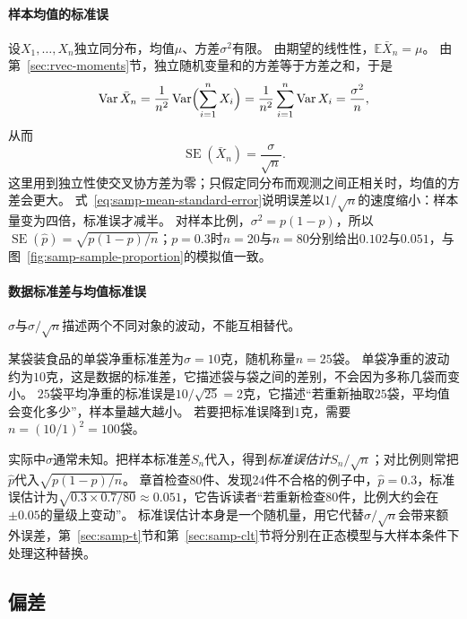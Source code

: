 \paragraph{样本均值的标准误}
设$X_1,\dots,X_n$独立同分布，均值$\mu$、方差$\sigma^2$有限。
由期望的线性性，$\mathbb{E}\bar X_n=\mu$。
由第~\ref{sec:rvec-moments}节，独立随机变量和的方差等于方差之和，于是
\[
  \operatorname{Var}\bar X_n=\frac1{n^2}\operatorname{Var}\Bigl(\sum_{i=1}^nX_i\Bigr)=\frac1{n^2}\sum_{i=1}^n\operatorname{Var}X_i=\frac{\sigma^2}{n},
\]
从而
\begin{equation}
  \operatorname{SE}(\bar X_n)=\frac{\sigma}{\sqrt n}.
  \label{eq:samp-mean-standard-error}
\end{equation}
这里用到独立性使交叉协方差为零；只假定同分布而观测之间正相关时，均值的方差会更大。
式~\eqref{eq:samp-mean-standard-error}说明误差以$1/\sqrt n$的速度缩小：样本量变为四倍，标准误才减半。
对样本比例，$\sigma^2=p(1-p)$，所以$\operatorname{SE}(\hat p)=\sqrt{p(1-p)/n}$；$p=0.3$时$n=20$与$n=80$分别给出$0.102$与$0.051$，与图~\ref{fig:samp-sample-proportion}的模拟值一致。

\paragraph{数据标准差与均值标准误}
$\sigma$与$\sigma/\sqrt n$描述两个不同对象的波动，不能互相替代。

\begin{example}[称重数据的两种标准差]
\label{ex:samp-weighing-standard-error}
某袋装食品的单袋净重标准差为$\sigma=10$克，随机称量$n=25$袋。
单袋净重的波动约为$10$克，这是数据的标准差，它描述袋与袋之间的差别，不会因为多称几袋而变小。
$25$袋平均净重的标准误是$10/\sqrt{25}=2$克，它描述“若重新抽取$25$袋，平均值会变化多少”，样本量越大越小。
若要把标准误降到$1$克，需要$n=(10/1)^2=100$袋。
\end{example}

实际中$\sigma$通常未知。把样本标准差$S_n$代入，得到\emph{标准误估计}$S_n/\sqrt n$；对比例则常把$\hat p$代入$\sqrt{p(1-p)/n}$。
章首检查$80$件、发现$24$件不合格的例子中，$\hat p=0.3$，标准误估计为$\sqrt{0.3\times0.7/80}\approx0.051$，它告诉读者“若重新检查$80$件，比例大约会在$\pm0.05$的量级上变动”。
标准误估计本身是一个随机量，用它代替$\sigma/\sqrt n$会带来额外误差，第~\ref{sec:samp-t}节和第~\ref{sec:samp-clt}节将分别在正态模型与大样本条件下处理这种替换。

\subsection{偏差}

